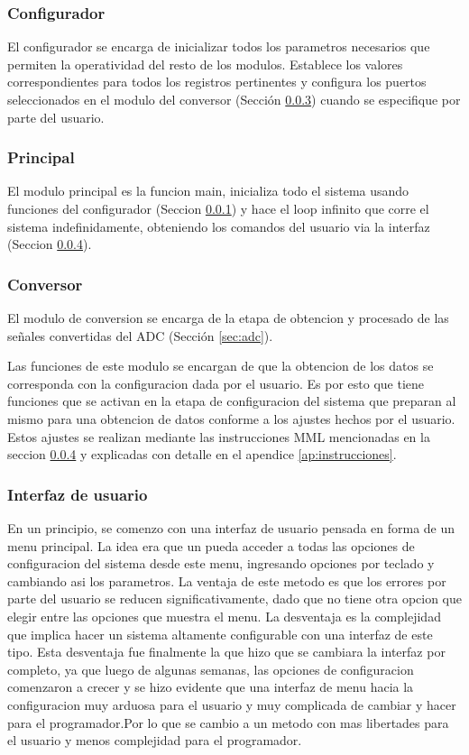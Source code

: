 \documentclass{article}
\theoremstyle{definition}
\theoremstyle{remark}
\begin{document}
\subsubsection{Configurador}\label{sec:configuradorsw}
El configurador se encarga de inicializar todos los parametros necesarios que permiten la operatividad del resto de los modulos. Establece los valores correspondientes para todos los registros pertinentes y configura los puertos seleccionados en el modulo del conversor (Sección \ref{sec:conversorsw}) cuando se especifique por parte del usuario.
\subsubsection{Principal}
El modulo principal es la funcion main, inicializa todo el sistema usando funciones del configurador (Seccion \ref{sec:configuradorsw}) y hace el loop infinito que corre el sistema indefinidamente, obteniendo los comandos del usuario via la interfaz (Seccion \ref{secc:interfaz}).

\subsubsection{Conversor}\label{sec:conversorsw}
El modulo de conversion se encarga de la etapa de obtencion y procesado de las señales convertidas del ADC (Sección \ref{sec:adc}).

Las funciones de este modulo se encargan de que la obtencion de los datos se corresponda con la configuracion dada por el usuario. Es por esto que tiene funciones que se activan en la etapa de configuracion del sistema que preparan al mismo para una obtencion de datos conforme a los ajustes hechos por el usuario. Estos ajustes se realizan mediante las instrucciones MML mencionadas en la seccion \ref{secc:interfaz} y explicadas con detalle en el apendice \ref{ap:instrucciones}.


\subsubsection{Interfaz de usuario}\label{secc:interfaz}
En un principio, se comenzo con una interfaz de usuario pensada en forma de un menu principal. La idea era que un pueda acceder a todas las opciones de configuracion del sistema desde este menu, ingresando opciones por teclado y cambiando asi los parametros. La ventaja de este metodo es que los errores por parte del usuario se reducen significativamente, dado que no tiene otra opcion que elegir entre las opciones que muestra el menu. La desventaja es la complejidad que implica hacer un sistema altamente configurable con una interfaz de este tipo. Esta desventaja fue finalmente la que hizo que se cambiara la interfaz por completo, ya que luego de algunas semanas, las opciones de configuracion comenzaron a crecer y se hizo evidente que una interfaz de menu hacia la configuracion muy arduosa para el usuario y muy complicada de cambiar y hacer para el programador.Por lo que se cambio a un metodo con mas libertades para el usuario y menos complejidad para el programador.
\end{document}
